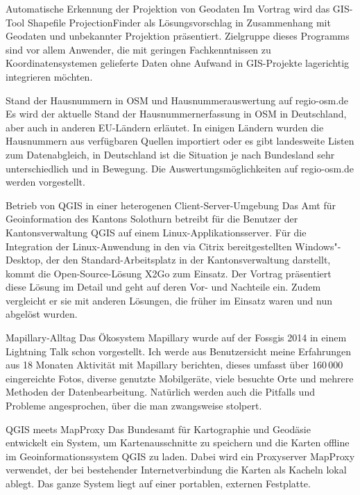 
%
{Automatische Erkennung der \mbox{Projektion} von Geodaten}%
{}%
{Im Vortrag wird das GIS-Tool Shapefile ProjectionFinder als Lösungsvorschlag
in Zusammenhang mit Geodaten und
unbekannter Projektion präsentiert. Zielgruppe dieses Programms sind vor
allem Anwender, die mit geringen
Fachkenntnissen zu Koordinatensystemen gelieferte Daten ohne Aufwand in
GIS-Projekte lagerichtig integrieren möchten.}

%
{Stand der Hausnummern in OSM und Hausnummerauswertung auf regio-osm.de}%
{}%
{Es wird der aktuelle Stand der Hausnummernerfassung in OSM in Deutschland, aber auch in anderen EU-Ländern erläutet.
In einigen Ländern wurden die Hausnummern aus verfügbaren Quellen importiert
oder es gibt landesweite Listen zum Datenabgleich, in Deutschland ist die
Situation je nach Bundesland sehr unterschiedlich und in Bewegung.
Die Auswertungsmöglichkeiten auf regio-osm.de werden vorgestellt.}


%
{Betrieb von QGIS in einer hete\-rogenen Client-Server-Umgebung}%
{}%
{Das Amt für Geoinformation des Kantons Solothurn betreibt für die Benutzer der
Kantonsverwaltung QGIS auf einem Linux-Applikationsserver. Für die Integration
der Linux-Anwendung in den via Citrix bereitgestellten Windows"-Desktop, der den
Standard-Arbeitsplatz in der Kantonsverwaltung darstellt, kommt die Open-Source-Lösung X2Go zum Einsatz.
Der Vortrag präsentiert diese Lösung im Detail und geht auf deren Vor- und
Nachteile ein. Zudem vergleicht er sie mit anderen Lösungen, die früher im Einsatz waren und nun abgelöst wurden.}

%
{Mapillary-Alltag}%
{}%
{Das Ökosystem Mapillary wurde auf der Fossgis 2014 in einem Lightning
Talk schon vorgestellt.
Ich werde aus Benutzersicht meine Erfahrungen aus 18 Monaten Aktivität mit
Mapillary berichten, dieses umfasst über 160\,000 eingereichte Fotos,
diverse genutzte Mobilgeräte, viele besuchte Orte und mehrere Methoden
der Datenbearbeitung. Natürlich werden auch die Pitfalls und Probleme angesprochen, über die
man zwangsweise stolpert.}


%
{QGIS meets MapProxy}%
{}%
{Das Bundesamt für Kartographie und Geodäsie entwickelt ein System, um Kartenausschnitte zu speichern und
die Karten offline im Geoinformationssystem QGIS zu laden. Dabei wird ein
Proxyserver MapProxy verwendet, der bei bestehender Internetverbindung
die Karten als Kacheln lokal ablegt. Das ganze System liegt auf einer
portablen, externen Festplatte.}

